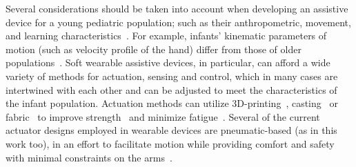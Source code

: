 \documentclass[letterpaper, 10pt, conference]{ieeeconf}      %
\begin{document}
Several considerations should be taken into account when developing an assistive device for a young pediatric population; such as their anthropometric, movement, and learning characteristics~\cite{wininger2017geek}. 
For example, infants' kinematic parameters of motion (such as velocity profile of the hand) differ from those of older populations~\cite{konczak1997development,morange2019visual}. 
Soft wearable assistive devices, in particular, can afford a wide variety of methods for actuation, sensing and control, which in many cases are intertwined with each other and can be adjusted to meet the characteristics of the infant population. %
Actuation methods can utilize 3D-printing~\cite{yap2016high,schaffner20183d,hoang2021pneumatic}, casting~\cite{li2020high,kokkoni2020development,liu2022safely} or fabric~\cite{yap2017fully,kim2021compact,nassour2020high,fu2022textiles,sahin2022bidirectional} to improve strength~\cite{simpson2020upper,o2017soft} and minimize fatigue~\cite{nassour2020high,o2020inflatable}. 
Several of the current actuator designs employed in wearable devices are pneumatic-based (as in this work too), in an effort to facilitate motion while providing comfort and safety with minimal constraints on the arms~\cite{diteesawat2022soft}. 
\end{document}
